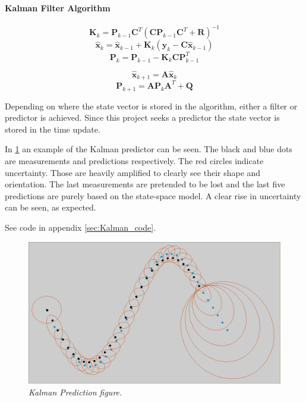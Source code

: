 \paragraph{Kalman Filter Algorithm}	

\begin{equation}
\label{}
\textbf{K}_{k} = \textbf{P}_{k-1}\textbf{C}^T(\textbf{C}\textbf{P}_{k-1}\textbf{C}^T + \textbf{R})^{-1}
\end{equation}
\begin{equation}
\label{}
\hat{\textbf{x}}_k = \hat{\textbf{x}}_{k-1} + \textbf{K}_k (\textbf{y}_k - \textbf{C}\hat{\textbf{x}}_{k-1})
\end{equation}
\begin{equation}
\label{}
\textbf{P}_k = \textbf{P}_{k-1} - \textbf{K}_k\textbf{C}\textbf{P}_{k-1}^T
\end{equation}

\begin{equation}
\label{}
\hat{\textbf{x}}_{k+1} = \textbf{A}\hat{\textbf{x}}_{k}
\end{equation}
\begin{equation}
\label{}
\textbf{P}_{k+1} = \textbf{A}\textbf{P}_{k}\textbf{A}^T + \textbf{Q}
\end{equation}

Depending on where the state vector is stored in the algorithm, either a filter or predictor is achieved. Since this project seeks a predictor the state vector is stored in the time update.

In \ref{fig:kalman_fig} an example of the Kalman predictor can be seen. The black and blue dots are measurements and predictions respectively. The red circles indicate uncertainty. Those are heavily amplified to clearly see their shape and orientation. The last measurements are pretended to be lost and the last five predictions are purely based on the state-space model. A clear rise in uncertainty can be seen, as expected. 
 
See code in appendix \ref{sec:Kalman_code}. %

\begin{figure}[htb]
	\centering
	\includegraphics[width=\linewidth]{images/Kalmask2}
	\caption{\textit{Kalman Prediction figure.}}
	\label{fig:kalman_fig} %
\end{figure}